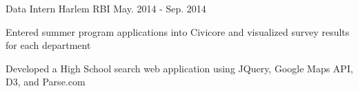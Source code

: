\begin{cventries}
\iffalse
  \cventry
    {IT Assistant} %
    {CCNY Tech Center} %
	{Sep. 2014 - Oct. 2014} %
    {} %
    {
      \begin{cvitems} %
        \item {Assisted students login and print issues}
        \item {Managed reservations for the study rooms}
        \item {Performed maintenance and troubleshooting on lab computers}
      \end{cvitems}
    }
\fi

\iftrue
  \cventry
    {Data Intern} %
    {Harlem RBI} %
	{May. 2014 - Sep. 2014} %
    {} %
    {
      \begin{cvitems} %
        \item {Entered summer program applications into Civicore and visualized survey results for each department}
        \item {Developed a High School search web application using JQuery, Google Maps API, D3, and Parse.com}
      \end{cvitems}
    }
\fi


\end{cventries}
